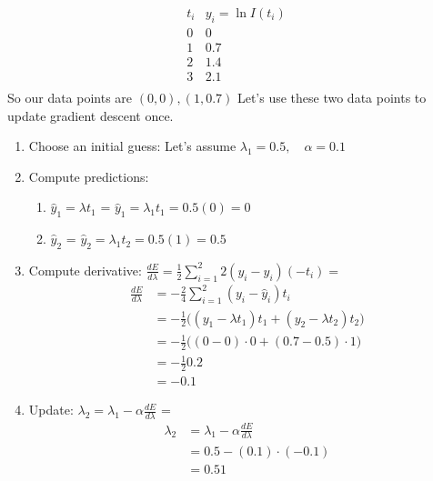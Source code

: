 \documentclass[11pt]{article}
\begin{document}
\[
\begin{array}{c|c}
t_i & y_i = \ln I(t_i) \\
\hline
0 & 0 \\
1 & 0.7 \\
2 & 1.4 \\
3 & 2.1 \\
\end{array}
\]
So our data points are $(0,0),(1,0.7)$ Let's use these two data points to update gradient descent once.

\begin{enumerate}
\item[(a)] Choose an initial guess:
Let's assume
$
\lambda_1 = 0.5, \quad \alpha = 0.1
$\\
\vspace{1cm}

\item[(b)] Compute predictions:
        \begin{enumerate}
        \item[(i)]$\hat{y}_1 = \lambda t_1$ = 
         {\color{blue}
         \underline{$\hat{y}_1 = \lambda_1 t_1  = 0.5(0) = 0$}
         }
        \vspace{2cm}
        
        
        \item[(ii)]$\hat{y}_2$ = {\color{blue}\underline{$\hat{y}_2 = \lambda_1 t_2 = 0.5(1) = 0.5$}
 }
        \vspace{2cm}
        \end{enumerate}
        
 
\item[(c)]  Compute derivative:
$
\frac{dE}{d\lambda} = \frac{1}{2} \sum_{i=1}^2 2(y_i - \hat{y}_i)(-t_i)
=$
 {\color{blue}
 \begin{align*}
     \frac{dE}{d\lambda} &= -\frac{2}{4} \sum_{i=1}^2 (y_i - \hat{y}_i)t_i \\
     &= -\frac{1}{2}\big((y_1 - \lambda t_1)t_1 + (y_2-  \lambda t_2)t_2\big)\\
     &= -\frac{1}{2}\big((0 - 0)\cdot 0 + (0.7-  0.5)\cdot 1\big)\\
     &= -\frac{1}{2}0.2\\
     &= -0.1
 \end{align*}
 }
\item[(d)] Update:
$
\lambda_2 = \lambda_1 - \alpha \frac{dE}{d\lambda}$
= 
 {\color{blue} 
 \begin{align*}
 \lambda_2 &= \lambda_1 - \alpha \frac{dE}{d\lambda} \\
 &= 0.5 - (0.1)\cdot (-0.1)\\
 &= 0.51
 \end{align*}
 }
\end{enumerate}
\end{document}
